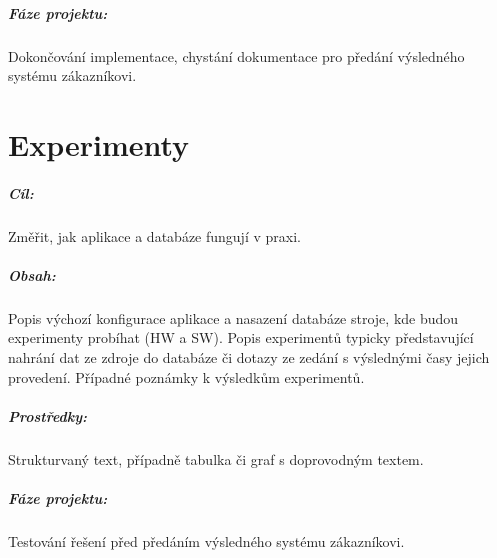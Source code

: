 \documentclass[10pt,xcolor=pdflatex,dvipsnames,table,oneside]{book}
\begin{document}
\paragraph{Fáze projektu:}
Dokončování implementace, chystání dokumentace pro předání výsledného systému zákazníkovi.

\chapter{Experimenty}

\paragraph{Cíl:}
Změřit, jak aplikace a databáze fungují v praxi.

\paragraph{Obsah:}
Popis výchozí konfigurace aplikace a nasazení databáze stroje, kde budou experimenty probíhat (HW a SW).
Popis experimentů typicky představující nahrání dat ze zdroje do databáze či dotazy ze zedání s výslednými časy jejich provedení.
Případné poznámky k výsledkům experimentů.

\paragraph{Prostředky:}
Strukturvaný text, případně tabulka či graf s doprovodným textem.

\paragraph{Fáze projektu:}
Testování řešení před předáním výsledného systému zákazníkovi.
\end{document}
